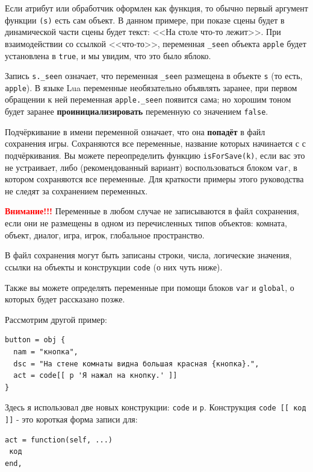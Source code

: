 \documentclass[a4paper,12pt]{article}
\begin{document}
Если атрибут или обработчик оформлен как функция, то обычно первый аргумент функции \verb/(s)/ есть сам объект. В данном примере, при показе сцены будет в динамической части сцены будет текст: <<На столе что-то лежит>>. При взаимодействии со ссылкой <<что-то>>, переменная \verb/_seen/ объекта \verb/apple/ будет установлена в \verb/true/, и мы увидим, что это было яблоко.

Запись \verb/s._seen/ означает, что переменная \verb/_seen/ размещена в объекте \verb/s/ (то есть, \verb/apple/). В языке Lua переменные необязательно объявлять заранее, при первом обращении к ней переменная \verb/apple._seen/ появится сама; но хорошим тоном будет заранее \textbf{проинициализировать} переменную со значением \verb/false/.

Подчёркивание в имени переменной означает, что она \textbf{попадёт} в файл сохранения игры. Сохраняются все переменные, название которых начинается с с подчёркивания. Вы можете переопределить функцию \verb/isForSave(k)/, если вас это не устраивает, либо (рекомендованный вариант) воспользоваться блоком \verb/var/, в котором сохраняются все переменные. Для краткости примеры этого руководства не следят за сохранением переменных.

\textbf{\textcolor{red}{Внимание!!!}} Переменные в любом случае не записываются в файл сохранения, если они не размещены в одном из перечисленных типов объектов: комната, объект, диалог, игра, игрок, глобальное пространство.

В файл сохранения могут быть записаны строки, числа, логические значения, ссылки на объекты и конструкции \verb/code/ (о них чуть ниже).

Также вы можете определять переменные при помощи блоков \verb/var/ и \verb/global/, о которых будет рассказано позже.

Рассмотрим другой пример:

\begin{verbatim}
button = obj {
  nam = "кнопка",
  dsc = "На стене комнаты видна большая красная {кнопка}.",
  act = code[[ p 'Я нажал на кнопку.' ]]
}
\end{verbatim}

Здесь я использовал две новых конструкции: \verb/code/ и \verb/p/. Конструкция \verb/code [[ код ]]/ - это короткая форма записи для:

\begin{verbatim}
act = function(self, ...)
 код
end,
\end{verbatim}
\end{document}
